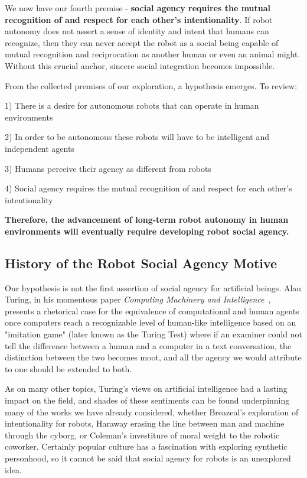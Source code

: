 \documentclass{sfuthesis}
\begin{document}
We now have our fourth premise - \textbf{social agency requires the mutual recognition of and respect for each other's intentionality}. If robot autonomy does not assert a sense of identity and intent that humans can recognize, then they can never accept the robot as a social being capable of mutual recognition and reciprocation as another human or even an animal might. Without this crucial anchor, sincere social integration becomes impossible.

From the collected premises of our exploration, a hypothesis emerges. To review:

1) There is a desire for autonomous robots that can operate in human environments

2) In order to be autonomous these robots will have to be intelligent and independent agents

3) Humans perceive their agency as different from robots

4) Social agency requires the mutual recognition of and respect for each other's intentionality

\textbf{Therefore, the advancement of long-term robot autonomy in human environments will eventually require developing robot social agency.}

\subsection{History of the Robot Social Agency Motive}

Our hypothesis is not the first assertion of social agency for artificial beings. Alan Turing, in his momentous paper \textit{Computing Machinery and Intelligence}~\cite{turing2009computing}, presents a rhetorical case for the equivalence of computational and human agents once computers reach a recognizable level of human-like intelligence based on an "imitation game" (later known as the Turing Test) where if an examiner could not tell the difference between a human and a computer in a text conversation, the distinction between the two becomes moot, and all the agency we would attribute to one should be extended to both. 

As on many other topics, Turing's views on artificial intelligence had a lasting impact on the field, and shades of these sentiments can be found underpinning many of the works we have already considered, whether Breazeal's exploration of intentionality for robots, Haraway erasing the line between man and machine through the cyborg, or Coleman's investiture of moral weight to the robotic coworker. Certainly popular culture has a fascination with exploring synthetic personhood, so it cannot be said that social agency for robots is an unexplored idea.
\end{document}

